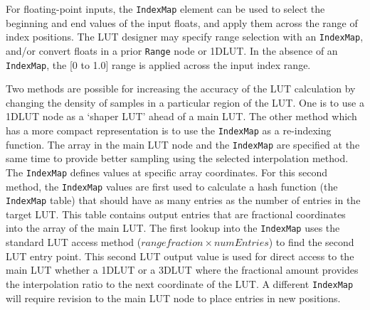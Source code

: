 For floating-point inputs, the \texttt{IndexMap} element can be used to select the beginning and end values of the input floats, and apply them across the range of index positions. The LUT designer  may specify range selection with an \texttt{IndexMap}, and/or convert floats in a prior \texttt{Range} node or 1DLUT. In the absence of an \texttt{IndexMap}, the [0 to 1.0] range is applied across the input index range.

Two methods are possible for increasing the accuracy of the LUT calculation by changing the density of samples in a particular region of the LUT. One is to use a 1DLUT node as a `shaper LUT' ahead of a main LUT. The other method which has a more compact representation is to use the \texttt{IndexMap} as a re-indexing function. The array in the main LUT node and the \texttt{IndexMap} are specified at the same time to provide better sampling using the selected interpolation method. The \texttt{IndexMap} defines values at specific array coordinates.  For this second method, the \texttt{IndexMap} values are first used to calculate a hash function (the \texttt{IndexMap} table) that should have as many entries as the number of entries in the target LUT. This table contains output entries that are fractional coordinates into the array of the main LUT. The first lookup into the \texttt{IndexMap} uses the standard LUT access method ($range fraction \times numEntries$) to find the second LUT entry point. This second LUT output value is used for direct access to the main LUT whether a 1DLUT or a 3DLUT where the fractional amount provides the interpolation ratio to the next coordinate of the LUT. A different \texttt{IndexMap} will require revision to the main LUT node to place entries in new positions.